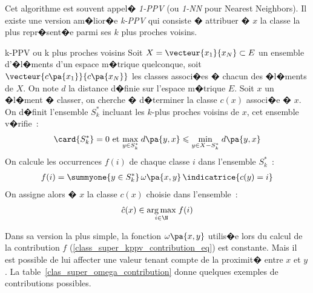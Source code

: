 Cet algorithme est souvent appel� \emph{1-PPV} (ou \emph{1-NN} pour Nearest Neighbors). Il existe une version am�lior�e \emph{k-PPV} qui consiste � attribuer � $x$ la classe la plus repr�sent�e parmi ses $k$ plus proches voisins.



        \begin{xalgorithm}{k-PPV ou k plus proches voisins}
        \label{clas_super_kppv_simple}
        Soit $X = \vecteur{x_1}{x_N} \subset E$ un ensemble d'�l�ments d'un espace m�trique quelconque, 
        soit $\vecteur{c\pa{x_1}}{c\pa{x_N}}$ les classes associ�es � chacun des �l�ments de $X$. On note 
        $d$ la distance d�finie sur l'espace m�trique $E$. Soit $x$
        un �l�ment � classer, on cherche � d�terminer la classe $c(x)$ associ�e � $x$. On d�finit l'ensemble $S^*_k$
        incluant les $k$-plus proches voisins de $x$, cet ensemble v�rifie~:
                        \begin{eqnarray*}
                        \card{S^*_k} = 0 \text{ et } 
                                                                         \underset{y \in S^*_k}{\max} \; d\pa{y,x} \leqslant
                                                                         \underset{y \in X - S^*_k}{\min} \; d\pa{y,x} 
                        \end{eqnarray*}
        On calcule les occurrences $f(i)$ de chaque classe $i$ dans l'ensemble $S^*_k$~: 
                        \begin{eqnarray}
                        f(i) = \summyone{y \in S^*_k} \, \omega\pa{x,y} \, \indicatrice{c(y) = i} 
                        \label{class_super_kppv_contribution_eq}
                        \end{eqnarray}
        On assigne alors � $x$ la classe $c(x)$ choisie dans l'ensemble~:
                        \begin{eqnarray*}
                        \hat{c}(x) \in \underset{i \in \N}{\arg \max} \; f(i)
                        \end{eqnarray*}
        \end{xalgorithm}

Dans sa version la plus simple, la fonction $\omega\pa{x,y}$ utilis�e lors du calcul de la contribution $f$ (\ref{class_super_kppv_contribution_eq}) est constante. Mais il est possible de lui affecter une valeur tenant compte de la proximit� entre $x$ et $y$. La table~\ref{clas_super_omega_contribution} donne quelques exemples de contributions possibles.


